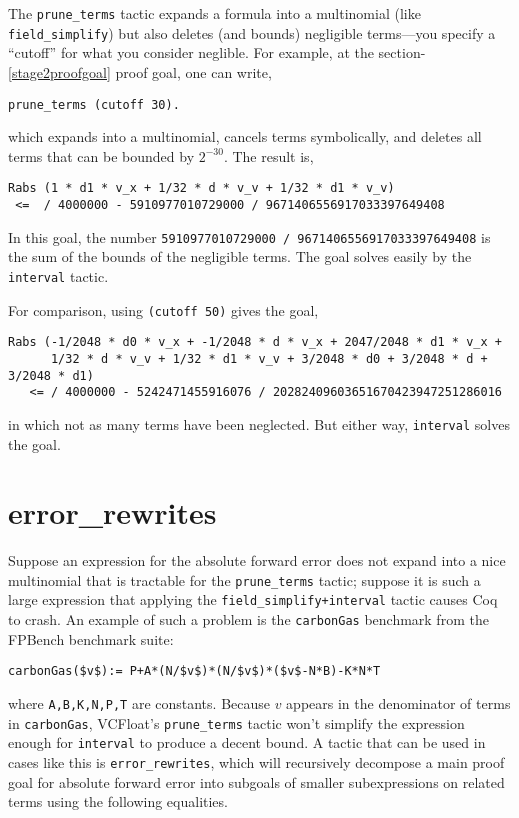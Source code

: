 \documentclass[article]{memoir}
\begin{document}
The \lstinline{prune_terms} tactic expands a formula into a
multinomial (like \lstinline{field_simplify}) but also
deletes (and bounds) negligible terms---you specify
a ``cutoff'' for what you consider neglible.  For example,
at the section-\ref{stage2proofgoal} proof goal,
one can write,

\begin{lstlisting}
prune_terms (cutoff 30).
\end{lstlisting}
which expands into a multinomial, cancels terms symbolically,
and deletes all terms that can be bounded by $2^{-30}$.
The result is,

\begin{lstlisting}
Rabs (1 * d1 * v_x + 1/32 * d * v_v + 1/32 * d1 * v_v)
 <=  / 4000000 - 5910977010729000 / 9671406556917033397649408
\end{lstlisting}
In this goal, the number \lstinline{5910977010729000 / 9671406556917033397649408} is the sum of the bounds of the negligible terms.
The goal solves easily by the \lstinline{interval} tactic.

For comparison, using \lstinline{(cutoff 50)} gives the goal,
\begin{lstlisting}
Rabs (-1/2048 * d0 * v_x + -1/2048 * d * v_x + 2047/2048 * d1 * v_x +
      1/32 * d * v_v + 1/32 * d1 * v_v + 3/2048 * d0 + 3/2048 * d + 3/2048 * d1)
   <= / 4000000 - 5242471455916076 / 20282409603651670423947251286016
\end{lstlisting}
in which not as many terms have been neglected.  But either way,
\lstinline{interval} solves the goal.
\chapter{error\_rewrites} Suppose an expression for the absolute
forward error does not expand into a nice multinomial
that is tractable for the \lstinline{prune_terms} tactic;
suppose it is such a large expression
that applying the \lstinline{field_simplify+interval} 
tactic causes Coq to crash. An example
of such a problem is the \lstinline{carbonGas} benchmark from the
FPBench benchmark suite:
\begin{lstlisting} 
carbonGas($v$):= P+A*(N/$v$)*(N/$v$)*($v$-N*B)-K*N*T
\end{lstlisting}
where \lstinline{A,B,K,N,P,T} are constants. Because $v$ 
appears in the denominator of terms in \lstinline{carbonGas},
VCFloat's \lstinline{prune_terms} tactic won't simplify the 
expression enough for \lstinline{interval} to produce a decent 
bound. A tactic that can be used in cases like this is 
\lstinline{error_rewrites}, which will recursively
decompose a main proof goal for absolute forward error into 
subgoals of smaller subexpressions on related terms using the 
following equalities.  
 
\end{document}
